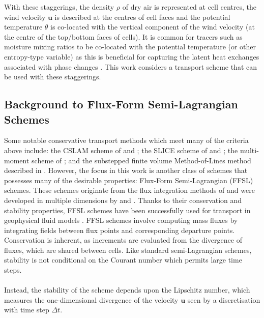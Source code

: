 \documentclass{ametsocV6.1}
\begin{document}
With these staggerings, the density $\rho$ of dry air is represented at cell centres, the wind velocity $\bm{u}$ is described at the centres of cell faces and the potential temperature $\theta$ is co-located with the vertical component of the wind velocity (at the centre of the top/bottom faces of cells).
It is common for tracers such as moisture mixing ratios to be co-located with the potential temperature (or other entropy-type variable) as this is beneficial for capturing the latent heat exchanges associated with phase changes \citep{bendall2023solution}.
This work considers a transport scheme that can be used with these staggerings.

\subsection{Background to Flux-Form Semi-Lagrangian Schemes}
Some notable conservative transport methods which meet many of the criteria above include: the CSLAM scheme of \citet{lauritzen2010conservative} and \citet{harris2011flux}; the SLICE scheme of \citet{zerroukat2002slice,zerroukat2004slice} and \citet{zerroukat2012three}; the multi-moment scheme of \cite{tang2022three}; and the substepped finite volume Method-of-Lines method described in \citet{melvin2024mixed}.
However, the focus in this work is another class of schemes that possesses many of the desirable properties: Flux-Form Semi-Lagrangian (FFSL) schemes.
These schemes originate from the flux integration methods of \citet{van1974towards,colella1984ppm,carpenter1990application}
and were developed in multiple dimensions by \citet{leonard1996cosmic} and \citet{lin1996ffsl}.
Thanks to their conservation and stability properties, FFSL schemes have been successfully used for transport in geophysical fluid models \citep{lin2004fvcore,putman2007fvtransport,zhou2012computational,neale2013mean,gillibrand2016mass,harris2021scientific,zhang2023history,mouallem2023implementation}.
FFSL schemes involve computing mass fluxes by integrating fields between flux points and corresponding departure points.
Conservation is inherent, as increments are evaluated from the divergence of fluxes, which are shared between cells.
Like standard semi-Lagrangian schemes, stability is not conditional on the Courant number which permits large time steps. \\
\\
Instead, the stability of the scheme depends upon the Lipschitz number, which measures the one-dimensional divergence of the velocity $\bm{u}$ seen by a discretisation with time step $\Delta t$.
\end{document}
